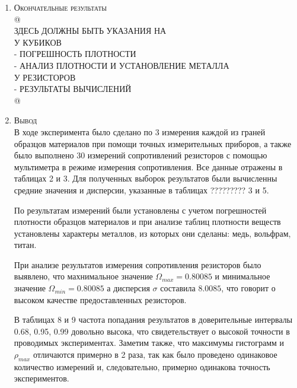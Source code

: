 \documentclass[12pt]{article}
\begin{document}
\begin{enumerate}
    \item \large\textsc{Окончательные результаты} \\
    @ \\
    ЗДЕСЬ ДОЛЖНЫ БЫТЬ УКАЗАНИЯ НА \\
    У КУБИКОВ \\
    - ПОГРЕШНОСТЬ ПЛОТНОСТИ \\
    - АНАЛИЗ ПЛОТНОСТИ И УСТАНОВЛЕНИЕ МЕТАЛЛА \\
    У РЕЗИСТОРОВ \\
    - РЕЗУЛЬТАТЫ ВЫЧИСЛЕНИЙ \\
    @

    \item \large\textsc{Вывод}
\\  В ходе эксперимента было сделано по 3 измерения каждой из граней образцов материалов при помощи точных измерительных приборов, а также было выполнено 30 измерений сопротивлений резисторов с помощью мультиметра в режиме измерения сопротивления. Все данные отражены в таблицах 2 и 3. Для полученных выборок результатов были вычисленны средние значения и дисперсии, указанные в таблицах ????????? 3 и 5.\par
По результатам измерений были установлены с учетом погрешностей плотности образцов материалов и при анализе таблиц плотности веществ установлены характеры металлов, из которых они сделаны: медь, вольфрам, титан. \par
При анализе результатов измерения сопротивления резисторов было выявлено, что махнимальное значение $\Omega_{max}=0.80085$ и минимальное значение $\Omega_{min}=0.80085$ а дисперсия $\sigma$ составила $8.0085$, что говорит о высоком качестве предоставленных резисторов.\par
В таблицах 8 и 9 частота попадания результатов в доверительные интервалы 0.68, 0.95, 0.99 довольно высока, что свидетельствует о высокой точности в проводимых экспериментах. Заметим также, что  максимумы гистограмм и $\rho_{max}$ отличаются примерно в 2 раза, так как было проведено одинаковое количество измерений и, следовательно, примерно одинакова точность экспериментов.
    
\end{enumerate}
\end{document}
